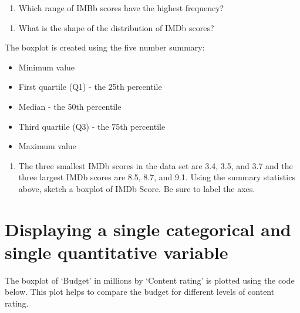 \documentclass[
]{report}
\providecommand{\tightlist}{%
  \setlength{\itemsep}{0pt}\setlength{\parskip}{0pt}}
\begin{document}
\begin{enumerate}
\def\labelenumi{\arabic{enumi}.}
\setcounter{enumi}{7}
\tightlist
\item
  Which range of IMBb scores have the highest frequency?
\end{enumerate}

\vspace{0.5in}

\begin{enumerate}
\def\labelenumi{\arabic{enumi}.}
\setcounter{enumi}{8}
\tightlist
\item
  What is the shape of the distribution of IMDb scores?
\end{enumerate}

\vspace{0.5in}

The boxplot is created using the five number summary:

\begin{itemize}
\item
  Minimum value
\item
  First quartile (Q1) - the 25th percentile
\item
  Median - the 50th percentile
\item
  Third quartile (Q3) - the 75th percentile
\item
  Maximum value
\end{itemize}

\begin{enumerate}
\def\labelenumi{\arabic{enumi}.}
\setcounter{enumi}{9}
\tightlist
\item
  The three smallest IMDb scores in the data set are 3.4, 3.5, and 3.7 and the three largest IMDb scores are 8.5, 8.7, and 9.1. Using the summary statistics above, sketch a boxplot of IMDb Score. Be sure to label the axes.
\end{enumerate}

\newpage

\hypertarget{displaying-a-single-categorical-and-single-quantitative-variable}{%
\section{Displaying a single categorical and single quantitative variable}\label{displaying-a-single-categorical-and-single-quantitative-variable}}

The boxplot of `Budget' in millions by `Content rating' is plotted using the code below. This plot helps to compare the budget for different levels of content rating.
\end{document}
